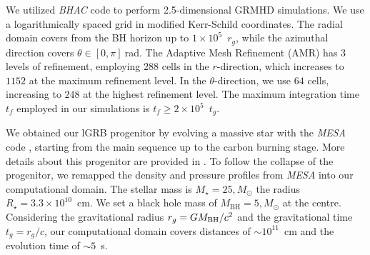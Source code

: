\documentclass{ptapap}
\begin{document}
We utilized \emph{BHAC} code \citep{Porth2016,Olivares2019a} to perform 2.5-dimensional GRMHD simulations. We use a logarithmically spaced grid in modified Kerr-Schild coordinates. The radial domain covers from the BH horizon up to $1\times 10^5$~$r_g$, while the azimuthal direction covers $\theta \in [0,\pi]~$rad. The Adaptive Mesh Refinement (AMR) has $3$ levels of refinement, employing $288$ cells in the $r$-direction, which increases to $1152$ at the maximum refinement level. In the $\theta$-direction, we use $64$ cells, increasing to $248$ at the highest refinement level. The maximum integration time $t_f$ employed in our simulations is $t_f \geq 2 \times 10^5$~$t_g$.

We obtained our lGRB progenitor by evolving a massive star with the \emph{MESA} code \citep{Paxton_2013,Paxton_2015,Paxton_2018,Paxton_2019}, starting from the main sequence up to the carbon burning stage. More details about this progenitor are provided in \citet{Urrutia2025Collapsar}. To follow the collapse of the progenitor, we remapped the density and pressure profiles from \textit{MESA} into our computational domain. The stellar mass is $M_\star = 25,M_\odot$ the radius $R_\star = 3.3 \times 10^{10}$~cm. We set a black hole mass of $M_{\mathrm{BH}} = 5,M_\odot$ at the centre. Considering the gravitational radius $r_g = GM_{\rm BH}/c^2$ and the gravitational time $t_g = r_g/c$, our computational domain covers distances of $\sim 10^{11}$~cm and the evolution time of $\sim 5$~s.
\end{document}
